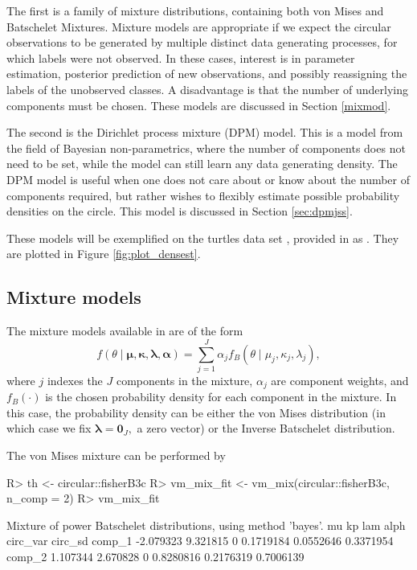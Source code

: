 The first is a family of mixture distributions, containing both von
Mises and Batschelet Mixtures. Mixture models are appropriate if we
expect the circular observations to be generated by multiple distinct
data generating processes, for which labels were not observed. In these
cases, interest is in parameter estimation, posterior prediction of new
observations, and possibly reassigning the labels of the unobserved
classes. A disadvantage is that the number of underlying components must
be chosen. These models are discussed in Section \ref{mixmod}.

The second is the Dirichlet process mixture (DPM) model. This is a model
from the field of Bayesian non-parametrics, where the number of
components does not need to be set, while the model can still learn any
data generating density. The DPM model is useful when one does not care
about or know about the number of components required, but rather wishes
to flexibly estimate possible probability densities on the circle. This
model is discussed in Section \ref{sec:dpmjss}.

These models will be exemplified on the turtles data set
\citep{stephens1969techniques, fisher1995statistical}, provided in
 as . They are plotted in Figure
\ref{fig:plot_densest}.

\hypertarget{mixture-models}{%
\subsection{Mixture models}\label{mixture-models}}

\label{mixmod}

The mixture models available in  are of the form
\begin{equation}
 f(\theta \mid \boldsymbol{\mu}, \boldsymbol{\kappa}, \boldsymbol{\lambda}, \boldsymbol{\alpha}) = \sum_{j = 1}^J\alpha_j f_B(\theta \mid \mu_j, \kappa_j, \lambda_j),
\end{equation} where \(j\) indexes the \(J\) components in the mixture,
\(\alpha_j\) are component weights, and \(f_B(\cdot)\) is the chosen
probability density for each component in the mixture. In this case, the
probability density can be either the von Mises distribution (in which
case we fix \(\boldsymbol{\lambda}= \boldsymbol{0}_J,\) a zero vector)
or the Inverse Batschelet distribution.

The von Mises mixture can be performed by

\begin{CodeChunk}

\begin{CodeInput}
R> th <- circular::fisherB3c
R> vm_mix_fit <- vm_mix(circular::fisherB3c, n_comp = 2)
R> vm_mix_fit
\end{CodeInput}

\begin{CodeOutput}
Mixture of power Batschelet distributions, using method 'bayes'.
              mu       kp lam      alph  circ_var   circ_sd
comp_1 -2.079323 9.321815   0 0.1719184 0.0552646 0.3371954
comp_2  1.107344 2.670828   0 0.8280816 0.2176319 0.7006139
\end{CodeOutput}
\end{CodeChunk}

